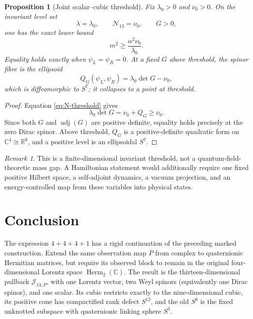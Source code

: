 \documentclass[11pt]{article}
\newtheorem{proposition}[theorem]{Proposition}
\theoremstyle{definition}
\theoremstyle{remark}
\newtheorem{remark}[theorem]{Remark}
\newcommand{\C}{\mathbb C}
\newcommand{\R}{\mathbb R}
\newcommand{\Herm}{\operatorname{Herm}}
\newcommand{\adj}{\operatorname{adj}}
\newcommand{\cJ}{\mathcal J}
\newcommand{\cN}{\mathcal N}
\begin{document}
\begin{proposition}[Joint scalar--cubic threshold]\label{prop:threshold}
Fix $\lambda_0>0$ and $\nu_0>0$.  On the invariant level set
\begin{equation}\label{eq:level-set}
 \lambda=\lambda_0,
 \qquad \cN_{13}=\nu_0,
 \qquad G>0,
\end{equation}
one has the exact lower bound
\begin{equation}\label{eq:mass-threshold}
 \boxed{m^2\ge\frac{\alpha^2\nu_0}{\lambda_0}.}
\end{equation}
Equality holds exactly when $\psi_L=\psi_R=0$.  At a fixed $G$ above threshold, the spinor fibre is the ellipsoid
\begin{equation}\label{eq:S7-fibre}
 Q_G(\psi_L,\psi_R)
 =\lambda_0\det G-\nu_0,
\end{equation}
which is diffeomorphic to $S^7$; it collapses to a point at threshold.
\end{proposition}

\begin{proof}
Equation \eqref{eq:N-threshold} gives
\[
 \lambda_0\det G=\nu_0+Q_G\ge\nu_0.
\]
Since both $G$ and $\adj(G)$ are positive definite, equality holds precisely at the zero Dirac spinor.  Above threshold, $Q_G$ is a positive-definite quadratic form on $\C^4\cong\R^8$, and a positive level is an ellipsoidal $S^7$.
\end{proof}

\begin{remark}
This is a finite-dimensional invariant threshold, not a quantum-field-theoretic mass gap.  A Hamiltonian statement would additionally require one fixed positive Hilbert space, a self-adjoint dynamics, a vacuum projection, and an energy-controlled map from these variables into physical states.
\end{remark}

\section{Conclusion}

The expression $4+4+4+1$ has a rigid continuation of the preceding marked construction.  Extend the same observation map $P$ from complex to quaternionic Hermitian matrices, but require its observed block to remain in the original four-dimensional Lorentz space $\Herm_2(\C)$.  The result is the thirteen-dimensional pullback $\cJ_{13,P}$, with one Lorentz vector, two Weyl spinors (equivalently one Dirac spinor), and one scalar.  Its cubic restricts exactly to the nine-dimensional cubic, its positive cone has compactified rank defect $S^{12}$, and the old $S^8$ is the fixed unknotted subspace with quaternionic linking sphere $S^3$.
\end{document}
